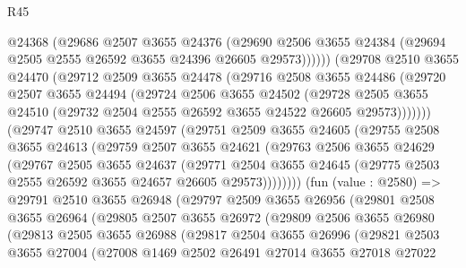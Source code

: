 \begin{lexlean}{R45}
\begin{coremodule}
              @24368
              (@29686
                @2507
                @3655
                @24376
                (@29690
                  @2506
                  @3655
                  @24384
                  (@29694 @2505 @2555 @26592 @3655 @24396 @26605 @29573))))))
        (@29708
          @2510
          @3655
          @24470
          (@29712
            @2509
            @3655
            @24478
            (@29716
              @2508
              @3655
              @24486
              (@29720
                @2507
                @3655
                @24494
                (@29724
                  @2506
                  @3655
                  @24502
                  (@29728
                    @2505
                    @3655
                    @24510
                    (@29732 @2504 @2555 @26592 @3655 @24522 @26605 @29573)))))))
        (@29747
          @2510
          @3655
          @24597
          (@29751
            @2509
            @3655
            @24605
            (@29755
              @2508
              @3655
              @24613
              (@29759
                @2507
                @3655
                @24621
                (@29763
                  @2506
                  @3655
                  @24629
                  (@29767
                    @2505
                    @3655
                    @24637
                    (@29771
                      @2504
                      @3655
                      @24645
                      (@29775 @2503 @2555 @26592 @3655 @24657 @26605 @29573))))))))
        (fun (value : @2580) =>
        @29791
          @2510
          @3655
          @26948
          (@29797
            @2509
            @3655
            @26956
            (@29801
              @2508
              @3655
              @26964
              (@29805
                @2507
                @3655
                @26972
                (@29809
                  @2506
                  @3655
                  @26980
                  (@29813
                    @2505
                    @3655
                    @26988
                    (@29817
                      @2504
                      @3655
                      @26996
                      (@29821
                        @2503
                        @3655
                        @27004
                        (@27008
                          @1469
                          @2502
                          @26491
                          @27014
                          @3655
                          @27018
                          @27022

\end{coremodule}
\end{lexlean}
